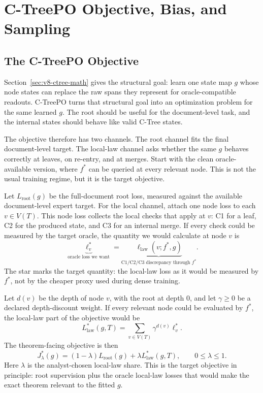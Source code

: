 \section{C-TreePO Objective, Bias, and Sampling}
\label{sec:v8-objective}

\subsection{The C-TreePO Objective}

Section~\ref{sec:v8-ctree-math} gives the structural goal: learn one state map
\(g\) whose node states can replace the raw spans they represent for
oracle-compatible readouts. C-TreePO turns that structural goal into an
optimization problem for the same learned \(g\). The root should be useful for
the document-level task, and the internal states should behave like valid
C-Tree states.

The objective therefore has two channels. The root channel fits the final
document-level target. The local-law channel asks whether the same \(g\)
behaves correctly at leaves, on re-entry, and at merges. Start with the clean
oracle-available version, where \(f^\ast\) can be queried at every relevant
node. This is not the usual training regime, but it is the target objective.

Let \(L_{\mathrm{root}}(g)\) be the full-document root loss, measured against
the available document-level expert target. For the local channel, attach one
node loss to each \(v\in V(T)\). This node loss collects the local checks that
apply at \(v\): C1 for a leaf, C2 for the produced state, and C3 for an
internal merge. If every check could be measured by the target oracle, the
quantity we would calculate at node \(v\) is
\[
  \underbrace{\ell_v^\ast}_{\text{oracle loss we want}}
  =
  \underbrace{\ell_{\mathrm{law}}(v;f^\ast,g)}_{\text{C1/C2/C3 discrepancy through }f^\ast}.
\]
The star marks the target quantity: the local-law loss as it would be measured
by \(f^\ast\), not by the cheaper proxy used during dense training.

Let \(d(v)\) be the depth of node \(v\), with the root at depth \(0\), and let
\(\gamma\ge 0\) be a declared depth-discount weight. If every relevant node
could be evaluated by \(f^\ast\), the local-law part of the objective would be
\begin{equation}
\label{eq:v8-local-law-estimand}
  L_{\mathrm{law}}^\ast(g,T)
  =
  \sum_{v\in V(T)}\gamma^{d(v)}\ell_v^\ast .
\end{equation}
The theorem-facing objective is then
\begin{equation}
\label{eq:v8-main-objective}
  J_\lambda^\ast(g)
  =
  (1-\lambda)L_{\mathrm{root}}(g)
  +
  \lambda L_{\mathrm{law}}^\ast(g,T),
  \qquad 0\le\lambda\le 1 .
\end{equation}
Here \(\lambda\) is the analyst-chosen local-law share. This is the target
objective in principle: root supervision plus the oracle local-law losses that
would make the exact theorem relevant to the fitted \(g\).

